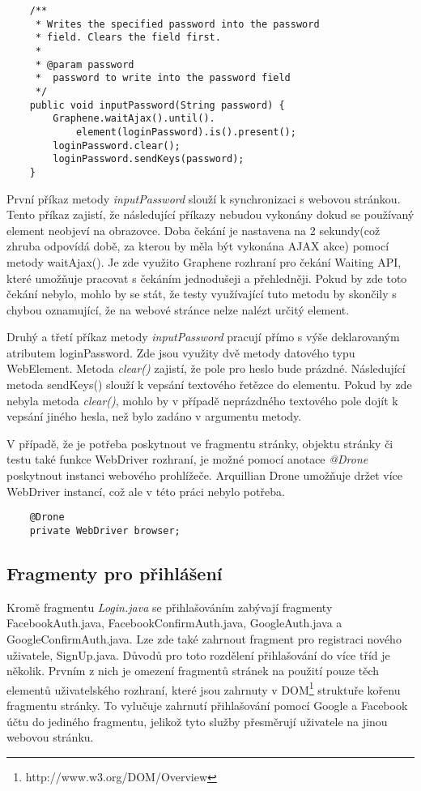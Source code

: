 \documentclass[
    color,   %
	table,   %
    twoside, %
    nolot, nolof
]{fithesis3}
\begin{document}
\begin{lstlisting}
	/**
	 * Writes the specified password into the password 
	 * field. Clears the field first.
	 * 
	 * @param password
	 * 	password to write into the password field
	 */
	public void inputPassword(String password) {
		Graphene.waitAjax().until().
			element(loginPassword).is().present();
		loginPassword.clear();
		loginPassword.sendKeys(password);
	}
\end{lstlisting} 

První příkaz metody \emph{inputPassword} slouží k synchronizaci s webovou stránkou. Tento příkaz zajistí, že následující příkazy nebudou vykonány dokud se používaný element neobjeví na obrazovce. Doba čekání je nastavena na 2 sekundy(což zhruba odpovídá době, za kterou by měla být vykonána AJAX akce) pomocí metody waitAjax(). Je zde využito Graphene rozhraní pro čekání Waiting API, které umožňuje pracovat s čekáním jednodušeji a přehledněji.  Pokud by zde toto čekání nebylo, mohlo by se stát, že testy využívající tuto metodu by skončily s chybou oznamující, že na webové stránce nelze nalézt určitý element.

Druhý a třetí příkaz metody \emph{inputPassword} pracují přímo s výše deklarovaným atributem loginPassword. Zde jsou využity dvě metody datového typu WebElement. Metoda \emph{clear()} zajistí, že pole pro heslo bude prázdné. Následující metoda sendKeys() slouží k vepsání textového řetězce do elementu. Pokud by zde nebyla metoda \emph{clear()}, mohlo by v případě neprázdného textového pole dojít k vepsání jiného hesla, než bylo zadáno v argumentu metody.

V případě, že je potřeba poskytnout ve fragmentu stránky, objektu stránky či testu také funkce WebDriver rozhraní, je možné pomocí anotace \emph{@Drone} poskytnout instanci webového prohlížeče. Arquillian Drone umožňuje držet více WebDriver instancí, což ale v této práci nebylo potřeba.

\begin{lstlisting}
	@Drone
	private WebDriver browser;
\end{lstlisting} 

\subsection*{Fragmenty pro přihlášení}
Kromě fragmentu \emph{Login.java} se přihlašováním zabývají fragmenty FacebookAuth.java, FacebookConfirmAuth.java, GoogleAuth.java a GoogleConfirmAuth.java. Lze zde také zahrnout fragment pro registraci nového uživatele, SignUp.java. Důvodů pro toto rozdělení přihlašování do více tříd je několik. Prvním z nich je omezení fragmentů stránek na použití pouze těch elementů uživatelského rozhraní, které jsou zahrnuty v DOM\footnote{http://www.w3.org/DOM/Overview} struktuře kořenu fragmentu stránky. To vylučuje zahrnutí přihlašování pomocí Google a Facebook účtu do jediného fragmentu, jelikož tyto služby přesměrují uživatele na jinou webovou stránku.
\end{document}
